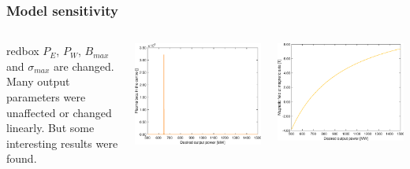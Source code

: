 \documentclass[hyperref={colorlinks=true,urlcolor=blue,linkcolor=.},aspectratio=1610,mathserif]{beamer}
\begin{document}
\begin{frame}
	\frametitle{Model sensitivity}
	\begin{columns}
		\begin{centering}
		\begin{beamercolorbox}[sep=1em,wd=8cm]{redbox}
              $P_{\si{E}}$, $P_{\si{W}}$, $B_{\si{max}}$ and $\sigma_{\si{max}}$ are changed. Many output parameters were unaffected or changed linearly. But some interesting results were found.
              \end{beamercolorbox}
        \end{centering}
        \centering
	    \includegraphics[width=\textwidth]{MatlabFigures/DesiredOutputPower/PlasmaBetaInTheCentre.eps}
		
		\includegraphics[width=\textwidth]{MatlabFigures/DesiredOutputPower/MagneticFieldAtMagneticAxis.eps}
	\end{columns}
\end{frame}
\end{document}
